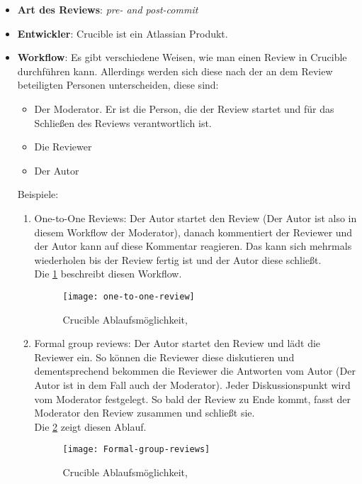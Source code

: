 \begin{itemize}
	\item \textbf{Art des Reviews}: \textit{pre- and post-commit}
	\item \textbf{Entwickler}: Crucible ist ein Atlassian Produkt.
	\item \textbf{Workflow}: Es gibt verschiedene Weisen, wie man einen Review in Crucible durchführen kann. Allerdings werden sich diese nach der an dem Review beteiligten Personen
		 unterscheiden, diese sind:
		\begin{itemize}
			\item Der Moderator. Er ist die Person, die der Review startet und für das Schließen des Reviews verantwortlich ist.
			\item Die Reviewer
			\item Der Autor
		\end{itemize}
		Beispiele:
		
		\begin{enumerate}
			\item One-to-One Reviews: Der Autor startet den Review (Der Autor ist also in diesem Workflow der Moderator), danach kommentiert der Reviewer und der Autor kann auf diese
				Kommentar reagieren. Das kann sich mehrmals wiederholen bis der Review fertig ist und der Autor diese schließt.\\
				Die \cref{fig:one-to-one-workflow} beschreibt diesen Workflow.
				\begin{figure}[H]
					\centering
					\texttt{[image: one-to-one-review]}
					\caption[Crucible: one-to-one-review]{Crucible Ablaufsmöglichkeit,\\ \cite{Crucible}}
					\label{fig:one-to-one-workflow}
				\end{figure}
				
			\item Formal group reviews: Der Autor startet den Review und lädt die Reviewer ein. So können die Reviewer diese diskutieren und dementsprechend bekommen die Reviewer 
				die Antworten vom Autor (Der Autor ist in dem Fall auch der Moderator). Jeder Diskussionspunkt wird vom Moderator festgelegt. So bald der Review zu Ende kommt,
				fasst der Moderator den Review zusammen und schließt sie.\\
				Die \cref{fig:Formal-group-review} zeigt diesen Ablauf.
				\begin{figure}[H]
					\centering
					\texttt{[image: Formal-group-reviews]}
					\caption[Crucible: Formal group review]{Crucible Ablaufsmöglichkeit,\\ \cite{Crucible}}
					\label{fig:Formal-group-review}
				\end{figure}
		\end{enumerate}
		
\end{itemize}

